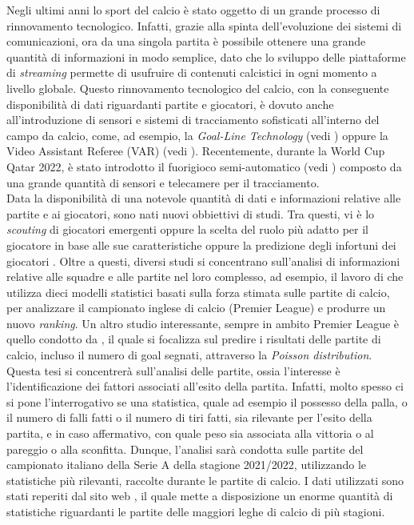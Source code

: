Negli ultimi anni lo sport del calcio è stato oggetto di un grande processo di rinnovamento tecnologico. Infatti, grazie alla spinta dell'evoluzione dei sistemi di comunicazioni, ora da una singola partita è possibile ottenere una grande quantità di informazioni in modo semplice, dato che lo sviluppo delle piattaforme di \emph{streaming} permette di usufruire di contenuti calcistici in ogni momento a livello globale. Questo rinnovamento tecnologico del calcio, con la conseguente disponibilità di dati riguardanti partite e giocatori, è dovuto anche all'introduzione di sensori e sistemi di tracciamento sofisticati all'interno del campo da calcio, come, ad esempio, la \emph{Goal-Line Technology} (vedi \textit{\cite{glt}}) oppure la Video Assistant Referee (VAR) (vedi \textit{\cite{var}}). Recentemente, durante la World Cup Qatar 2022, è stato introdotto il fuorigioco semi-automatico (vedi \textit{\cite{offside}}) composto da una grande quantità di sensori e telecamere per il tracciamento.\\
Data la disponibilità di una notevole quantità di dati e informazioni relative alle partite e ai giocatori, sono nati nuovi obbiettivi di studi. Tra questi, vi è lo \textit{scouting} di giocatori emergenti \autocite{vilela2018towards} oppure la scelta del ruolo più adatto per il giocatore in base alle sue caratteristiche \autocite{razali2017predicting} oppure la predizione degli infortuni dei giocatori \autocite{theron2020use}. Oltre a questi, diversi studi si concentrano sull'analisi di informazioni relative alle squadre e alle partite nel loro complesso, ad esempio, il lavoro di \autocite{ley2019ranking} che utilizza dieci modelli statistici basati sulla forza stimata sulle partite di calcio, per analizzare il campionato inglese di calcio (Premier League) e produrre un nuovo \emph{ranking}. Un altro studio interessante, sempre in ambito Premier League è quello condotto da \autocite{raval2020can}, il quale si focalizza sul predire i risultati delle partite di calcio, incluso il numero di goal segnati, attraverso la \emph{Poisson distribution}.\\
Questa tesi si concentrerà sull'analisi delle partite, ossia l'interesse è l'identificazione dei fattori associati all'esito della partita. Infatti, molto spesso ci si pone l'interrogativo se una statistica, quale ad esempio il possesso della palla, o il numero di falli fatti o il numero di tiri fatti, sia rilevante per l'esito della partita, e in caso affermativo, con quale peso sia associata alla vittoria o al pareggio o alla sconfitta. Dunque, l'analisi sarà condotta sulle partite del campionato italiano della Serie A della stagione 2021/2022, utilizzando le statistiche più rilevanti, raccolte durante le partite di calcio. I dati utilizzati sono stati reperiti dal sito web \textit{\cite{fbref}}, il quale mette a disposizione un enorme quantità di statistiche riguardanti le partite delle maggiori leghe di calcio di più stagioni.\\
